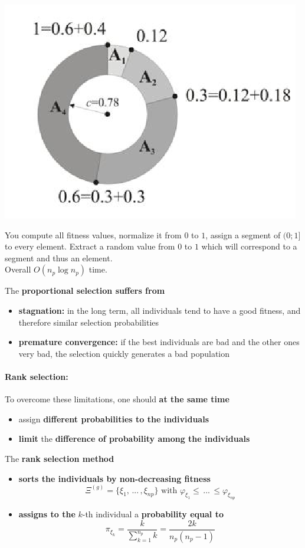 \documentclass[11pt]{article}
\begin{document}
	\begin{center}
		\includegraphics[width=0.5\columnwidth]{img/selectionwheel}
	\end{center}
	
	You compute all fitness values, normalize it from $0$ to $1$, assign a segment of $(0; 1]$ to every element. Extract a random value from $0$ to $1$ which will correspond to a segment and thus an element.\\
	
	Overall $O (n_p \log n_p)$ time.\\
	
	\newpage
	
	
	The \textbf{proportional selection suffers from}
	\begin{itemize}
		\item \textbf{stagnation:} in the long term, all individuals tend to have a good fitness, and therefore similar selection probabilities
		\item \textbf{premature convergence:} if the best individuals are bad and the other ones very bad, the selection quickly generates a bad population
	\end{itemize}
	
	\nn
	
	\paragraph{Rank selection:} To overcome these limitations, one should \textbf{at the same time}
	\begin{itemize}
		\item assign \textbf{different probabilities to the individuals}
		\item \textbf{limit} the \textbf{difference of probability among the individuals}
	\end{itemize}
	
	The \textbf{rank selection method}
	\begin{itemize}
		\item \textbf{sorts the individuals by non-decreasing fitness}
		$$ \Xi^{(g )} = \{ \xi_1, \, ... \, , \xi_{np}\} \text{ with } \varphi_{\xi_1} \leq \, ... \, \leq \varphi_{\xi_{np}} $$
		
		\item \textbf{assigns to the} $k$-th individual a \textbf{probability equal to}
		$$ \pi_{\xi_k} = \frac{k}{\sum_{k=1}^{n_p} k} = \frac{2k}{n_p (n_p -1)} $$
	\end{itemize}
	
\end{document}

